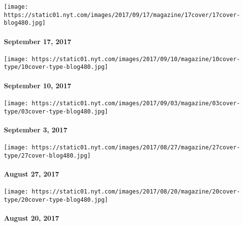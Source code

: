 \href{https://www.nytimes.com/issue/magazine/2017/09/15/91717-issue}{}

\texttt{[image: https://static01.nyt.com/images/2017/09/17/magazine/17cover/17cover-blog480.jpg]}

\hypertarget{september-17-2017}{%
\paragraph{September 17, 2017}\label{september-17-2017}}

\href{https://www.nytimes.com/issue/magazine/2017/09/08/91017-issue}{}

\texttt{[image: https://static01.nyt.com/images/2017/09/10/magazine/10cover-type/10cover-type-blog480.jpg]}

\hypertarget{september-10-2017}{%
\paragraph{September 10, 2017}\label{september-10-2017}}

\href{https://www.nytimes.com/issue/magazine/2017/09/01/90317-issue}{}

\texttt{[image: https://static01.nyt.com/images/2017/09/03/magazine/03cover-type/03cover-type-blog480.jpg]}

\hypertarget{september-3-2017}{%
\paragraph{September 3, 2017}\label{september-3-2017}}

\href{https://www.nytimes.com/issue/magazine/2017/08/25/the-82717-issue}{}

\texttt{[image: https://static01.nyt.com/images/2017/08/27/magazine/27cover-type/27cover-blog480.jpg]}

\hypertarget{august-27-2017}{%
\paragraph{August 27, 2017}\label{august-27-2017}}

\href{https://www.nytimes.com/issue/magazine/2017/08/18/82017-issue}{}

\texttt{[image: https://static01.nyt.com/images/2017/08/20/magazine/20cover-type/20cover-type-blog480.jpg]}

\hypertarget{august-20-2017}{%
\paragraph{August 20, 2017}\label{august-20-2017}}

